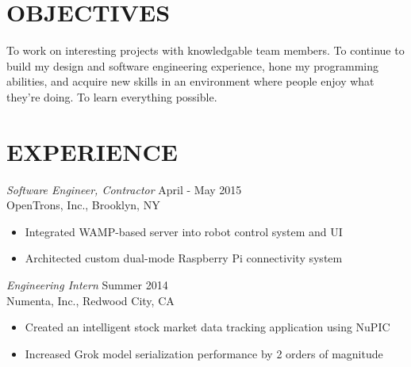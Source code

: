 \documentclass[margin,5pt]{res} %
\begin{document}
\address{me@vsinha.com\\ vsinha.com \\github.com/vsinha}
\address{4725 Clarendon Dr. \\ San Jose, CA 95129\\(408) 505-1275}


\begin{resume}

 
\section{OBJECTIVES}To work on interesting projects with knowledgable team members. To continue to build
my design and software engineering experience, hone my programming abilities, and acquire new skills
in an environment where people enjoy what they're doing. To learn everything possible.

 
\section{EXPERIENCE} 
	{\sl Software Engineer, Contractor} \hfill April - May 2015\\
		OpenTrons, Inc., Brooklyn, NY
		\begin{itemize} \itemsep -2pt
		\item Integrated WAMP-based server into robot control system and UI
		\item Architected custom dual-mode Raspberry Pi connectivity system
		\end{itemize}

	
	{\sl Engineering Intern} \hfill Summer 2014\\
          Numenta, Inc., Redwood City, CA
		\begin{itemize} \itemsep -2pt
		\item Created an intelligent stock market data tracking application using NuPIC
		\item Increased Grok model serialization performance by 2 orders of magnitude
		\end{itemize}


\end{resume}
\end{document}
